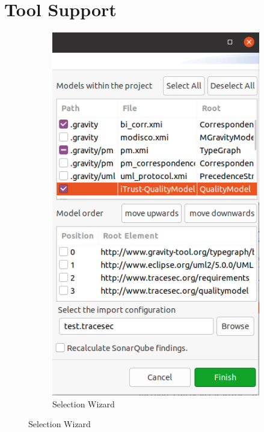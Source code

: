 \section{Tool Support}
\label{sec:tool}
\begin{figure}
    \centering
    \begin{subfigure}{.365\columnwidth}
    \includegraphics[width=\columnwidth]{figures/tracesec-impl-selection.png}
    \caption{Selection Wizard}
    \label{fig:wizard}
    \end{subfigure}

\end{figure}
